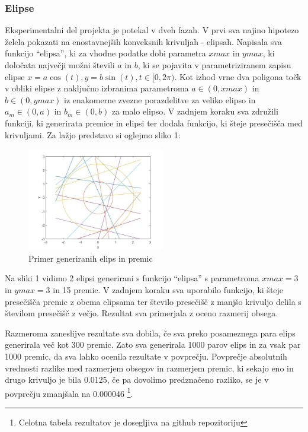 \documentclass[a4paper]{article}
\begin{document}
\subsubsection{Elipse}
Eksperimentalni del projekta je potekal v dveh fazah. V prvi sva najino hipotezo želela pokazati na enostavnejših konveksnih krivuljah - elipsah. Napisala sva funkcijo ``elipsa'', ki za vhodne podatke dobi parametra $xmax$ in $ymax$, ki določata največji možni števili $a$ in $b$, ki se pojavita v parametriziranem zapisu elipse $x=a \cos(t), y=b \sin(t), t\in [0, 2\pi)$. Kot izhod vrne dva poligona točk v obliki elipse z naključno izbranima parametroma $a \in (0, xmax)$ in $b \in (0, ymax)$ iz enakomerne zvezne porazdelitve za veliko elipso in $a_m \in (0, a)$ in $b_m \in (0, b)$ za malo elipso. V zadnjem koraku sva združili funkciji, ki generirata premice in elipsi ter dodala funkcijo, ki šteje presečišča med krivuljami. Za lažjo predstavo si oglejmo sliko 1:

\begin{figure}[h]
\centering
\includegraphics[width=60mm]{graf_primer.jpg}
\caption{Primer generiranih elips in premic \label{overflow}}
\end{figure} 

Na sliki 1 vidimo 2 elipsi generirani s funkcijo ``elipsa'' s parametroma $xmax=3$ in $ymax=3$ in 15 premic. V zadnjem koraku sva uporabilo funkcijo, ki šteje presečišča premic z obema elipsama ter število presečišč z manjšo krivuljo delila s številom presečišč z večjo. Rezultat sva primerjala z oceno razmerij obsega. 

Razmeroma zaneslijve rezultate sva dobila, če sva preko posameznega para elips generirala več kot 300 premic. Zato sva generirala 1000 parov elips in za vsak par 1000 premic, da sva lahko ocenila rezultate v povprečju. Povprečje absolutnih vrednosti razlike med razmerjem obsegov in razmerjem premic, ki sekajo eno in drugo krivuljo je bila 0.0125, če pa dovolimo predznačeno razliko, se je v povprečju zmanjšala na 0.000046 \footnote[1]{Celotna tabela rezultatov je dosegljiva na github repozitoriju}.
\end{document}
